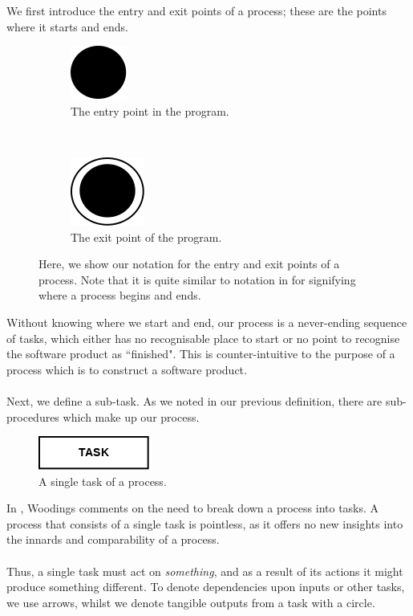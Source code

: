 We first introduce the entry and exit points of a process; these are the points where it starts and
ends.

\begin{figure}[h!]
\centering
\begin{subfigure}[b]{.45\textwidth}
\centering
\includegraphics[scale=0.6]{media/Entry}
\caption{The entry point in the program.}
\label{entryFigure}
\end{subfigure}
~
\begin{subfigure}[b]{.45\textwidth}
\centering
\includegraphics[scale=0.6]{media/Exit}
\caption{The exit point of the program.}
\label{exitFigure}
\end{subfigure}
\caption{Here, we show our notation for the entry and exit points of a process.
Note that it is quite similar to notation in \cite{Dumas01umlactivity} for
  signifying where a process begins and ends.}
\label{entryExitFigure}
\end{figure}

Without knowing where we start and end, our process is a never-ending sequence of tasks, which
either has no recognisable place to start or no point to recognise the software product as
``finished".
This is counter-intuitive to the purpose of a process which is to construct a software product.\\
\\
Next, we define a sub-task.
As we noted in our previous definition, there are sub-procedures which make up our process.

\begin{figure}[h!]
\centering
\includegraphics[scale=0.6]{media/Task}
\caption{A single task of a process.}
\label{taskFigure}
\end{figure}

In \cite{Woodings2013Tut1}, Woodings comments on the need to break down a
process into tasks.
A process that consists of a single task is pointless, as it offers no new
insights into the innards and comparability of a process.\\
\\
Thus, a single task must act on {\em something}, and as a result of its actions
it might produce something different.
To denote dependencies upon inputs or other tasks, we use arrows, whilst we denote tangible outputs
from a task with a circle.

